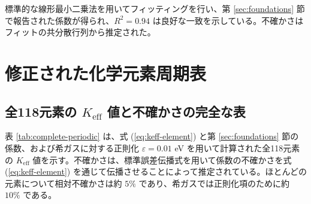 \documentclass[11pt,a4paper]{article}
\newcommand{\Keff}{K_{\mathrm{eff}}}
\begin{document}
	標準的な線形最小二乗法を用いてフィッティングを行い、第 \ref{sec:foundations} 節で報告された係数が得られ、$R^2 = 0.94$ は良好な一致を示している。不確かさはフィットの共分散行列から推定された。
	
	\section{修正された化学元素周期表}
	\label{sec:periodic-table}
	
	\subsection{全118元素の $\Keff$ 値と不確かさの完全な表}
	
	表 \ref{tab:complete-periodic} は、式 (\ref{eq:keff-element}) と第 \ref{sec:foundations} 節の係数、および希ガスに対する正則化 $\varepsilon = 0.01$ eV を用いて計算された全118元素の $\Keff$ 値を示す。不確かさは、標準誤差伝播式を用いて係数の不確かさを式 (\ref{eq:keff-element}) を通じて伝播させることによって推定されている。ほとんどの元素について相対不確かさは約 $5\%$ であり、希ガスでは正則化項のために約 $10\%$ である。
	
	
\end{document}
